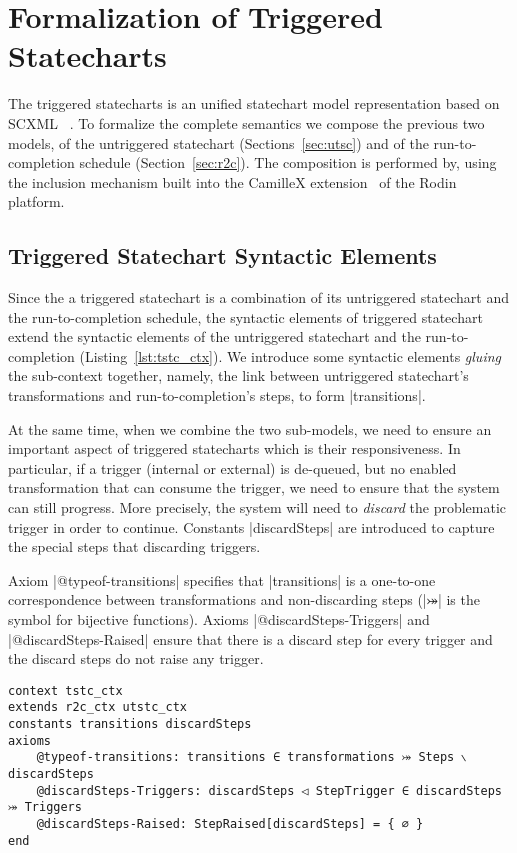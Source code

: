 \section{Formalization of Triggered Statecharts}
\label{sec:tstc}

The triggered statecharts is an unified statechart model representation based 
on SCXML ~\cite{scxmlwebsite}. To formalize the complete semantics we compose the previous two models, of the untriggered statechart (Sections~\ref{sec:utsc}) and of the run-to-completion schedule (Section~\ref{sec:r2c}).
The composition is performed by, using the inclusion mechanism built into the CamilleX extension~\cite{DBLP:conf/sefm/HoangSDFB22} of the Rodin platform.

\subsection{Triggered Statechart Syntactic Elements}
\label{sec:tstc-syntax}
Since the a triggered statechart is a combination of its untriggered statechart and the run-to-completion schedule, the syntactic elements of triggered statechart extend the syntactic elements of the untriggered statechart and the run-to-completion (Listing~\ref{lst:tstc_ctx}). We introduce some syntactic elements \emph{gluing} the sub-context together, namely, the link between untriggered statechart's transformations and run-to-completion's steps, to form |transitions|.

At the same time, when we combine the two sub-models, we need to ensure an important aspect of triggered statecharts which is their responsiveness. In particular, if a trigger (internal or external) is de-queued, but no enabled transformation that can consume the trigger, we need to ensure that the system can still progress. More precisely, the system will need to \emph{discard} the problematic trigger in order to continue. Constants |discardSteps| are introduced to capture the special steps that discarding triggers.

Axiom |@typeof-transitions| specifies that |transitions| is a one-to-one correspondence between transformations and non-discarding steps (|⤖| is the symbol for bijective functions). Axioms |@discardSteps-Triggers| and |@discardSteps-Raised| ensure that there is a discard step for every trigger and the discard steps do not raise any trigger.
\begin{lstlisting}[language=Event-B, caption = {Context for Triggered Statecart}, label = {lst:tstc_ctx}]
context tstc_ctx
extends r2c_ctx utstc_ctx
constants transitions discardSteps
axioms
	@typeof-transitions: transitions ∈ transformations ⤖ Steps ∖ discardSteps
	@discardSteps-Triggers: discardSteps ◁ StepTrigger ∈ discardSteps ⤖ Triggers
	@discardSteps-Raised: StepRaised[discardSteps] = { ∅ }
end
\end{lstlisting}

